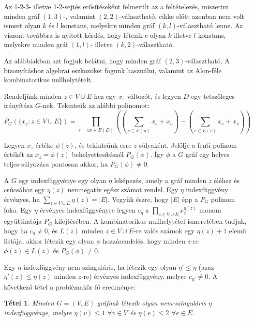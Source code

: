 \documentclass[12pt, a4paper]{report}
\newtheorem{tét}{Tétel}[section]
\theoremstyle{remark}
\theoremstyle{definition}
\begin{document}
Az 1-2-3- illetve 1-2-sejtés erősítéseként felmerült az a feltételezés, miszerint minden gráf $(1, 3)$-, valamint $(2, 2)$-választható. \citeauthor{Wong2014} cikke előtt azonban nem volt ismert olyan $k$ és $l$ konstans, melyekre minden gráf $(k, l)$-választható lenne. Az viszont továbbra is nyitott kérdés, hogy létezik-e olyan $k$ illetve $l$ konstans, melyekre minden gráf $(1, l)$- illetve $(k, 2)$-választható.

Az alábbiakban azt fogjuk belátni, hogy minden gráf $(2, 3)$-választható. A bizonyításhoz algebrai eszközöket fogunk használni, valamint az Alon-féle kombinatorikus nullhelytételt.

Rendeljünk minden $z \in V \cup E$-hez egy $x_z$ változót, és legyen $D$ egy tetszőleges irányítása $G$-nek. Tekintsük az alábbi polinomot:
\begin{equation}
P_G(\lbrace x_z: z \in V \cup E \rbrace) = \prod_{e = uv \in E(D)} \left( \left( \sum_{e \in E(u)} x_e + x_u \right) - \left( \sum_{e \in E(v)} x_e + x_v \right) \right)
\end{equation}

Legyen $x_z$ értéke $\phi(z)$, és tekintsünk erre $z$ súlyaként. Jelölje a fenti polinom értékét az $x_z = \phi(z)$ behelyettesítésnél $P_G(\phi)$. Így $\phi$ a $G$ gráf egy helyes teljes-súlyozása pontosan akkor, ha $P_G(\phi) \neq 0$.

A $G$ egy indexfüggvénye egy olyan $\eta$ leképezés, amely a gráf minden $z$ éléhez és csúcsához egy $\eta(z)$ nemnegatív egész számot rendel. Egy $\eta$ indexfüggvény érvényes, ha $\sum\limits_{z \in V \cup E} \eta(z) = |E|$. Vegyük észre, hogy $|E|$ épp a $P_G$ polinom foka. Egy $\eta$ érvényes indexfüggvényre legyen $c_\eta$ a $\prod\limits_{z \in V \cup E} x_z^{\eta(z)} $ monom együtthatója $P_G$ kifejtésében. A kombinatorikus nullhelytétel ismeretében tudjuk, hogy ha $c_\eta \neq 0$, és $L(z)$ minden $z \in V \cup E$-re valós számok egy $\eta(z) + 1$ elemű listája, akkor létezik egy olyan $\phi$ hozzárendelés, hogy minden $z$-re $\phi(z) \in L(z)$ és $P_G(\phi) \neq 0$.

Egy $\eta$ indexfüggvény nem-szinguláris, ha létezik egy olyan $\eta' \leq \eta$ (azaz $\eta'(z) \leq \eta(z)$ minden $z$-re) érvényes indexfüggvény, melyre $c_{\eta'} \neq 0$. A következő tétel a problémakör fő eredménye:

\begin{tét}
Minden $G = (V, E)$ gráfnak létezik olyan nem-szinguláris $\eta$ indexfüggvénye, melyre $\eta(v) \leq 1$ $\forall v \in V$ és $\eta(e) \leq 2$ $\forall e \in E$.
\end{tét}
\end{document}
